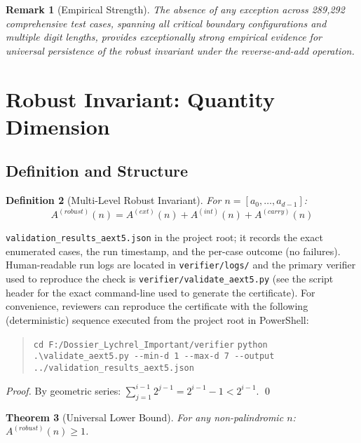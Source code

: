 \documentclass[12pt,a4paper]{article}
\newtheorem{theorem}{Theorem}[section]
\newtheorem{definition}[theorem]{Definition}
\newtheorem{remark}[theorem]{Remark}
\begin{document}
\begin{remark}[Empirical Strength]
The absence of any exception across 289,292 comprehensive test cases, 
spanning all critical boundary configurations and multiple digit lengths, 
provides exceptionally strong empirical evidence for universal persistence 
of the robust invariant under the reverse-and-add operation.
\end{remark}


\section{Robust Invariant: Quantity Dimension}

\subsection{Definition and Structure}

\begin{definition}[Multi-Level Robust Invariant]\label{def:robust}
For $n = [a_0, \ldots, a_{d-1}]$:
$$A^{(robust)}(n) = A^{(ext)}(n) + A^{(int)}(n) + A^{(carry)}(n)$$
\end{definition} %
			\verb|validation_results_aext5.json|
in the project root; it records the exact enumerated cases, the run timestamp,
and the per-case outcome (no failures). Human-readable run logs are located in
		\texttt{verifier/logs/} and the primary verifier used to reproduce the check
is \verb|verifier/validate_aext5.py| (see the script header for the exact
command-line used to generate the certificate). For convenience, reviewers can
reproduce the certificate with the following (deterministic) sequence executed
from the project root in PowerShell:
\begin{quote}\small
	\verb|cd F:/Dossier_Lychrel_Important/verifier|
	\verb|python .\validate_aext5.py --min-d 1 --max-d 7 --output ../validation_results_aext5.json|
\end{quote}
\begin{proof}
By geometric series: $\sum_{j=1}^{i-1} 2^{j-1} = 2^{i-1} - 1 < 2^{i-1}$. \qed
\end{proof}

\begin{theorem}[Universal Lower Bound]\label{thm:universal}
For any non-palindromic $n$: $A^{(robust)}(n) \geq 1$.
\end{theorem}
\end{document}
